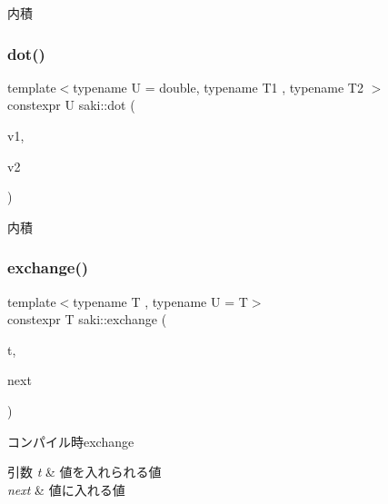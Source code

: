 内積 

\mbox{\label{namespacesaki_a6ed2a14726e1df49115a45e829f2d9a2}} 
\subsubsection{\texorpdfstring{dot()}{dot()}\hspace{0.1cm}{\footnotesize\ttfamily [3/3]}}
{\footnotesize\ttfamily template$<$typename U  = double, typename T1 , typename T2 $>$ \\
constexpr U saki\+::dot (\begin{DoxyParamCaption}\item[{const \mbox{\hyperlink{classsaki_1_1_vector4}{saki\+::\+Vector4}}$<$ T1 $>$ \&}]{v1,  }\item[{const \mbox{\hyperlink{classsaki_1_1_vector4}{saki\+::\+Vector4}}$<$ T2 $>$ \&}]{v2 }\end{DoxyParamCaption})}



内積 

\mbox{\label{namespacesaki_a41390f371e093d85f55a61f26277c185}} 
\subsubsection{\texorpdfstring{exchange()}{exchange()}}
{\footnotesize\ttfamily template$<$typename T , typename U  = T$>$ \\
constexpr T saki\+::exchange (\begin{DoxyParamCaption}\item[{T \&}]{t,  }\item[{U \&\&}]{next }\end{DoxyParamCaption})}



コンパイル時exchange 


\begin{DoxyParams}{引数}
{\em t} & 値を入れられる値 \\
\hline
{\em next} & 値に入れる値 \\
\hline
\end{DoxyParams}
\mbox{\label{namespacesaki_a224c4843b72acf995e13809a5caaafd8}} 
